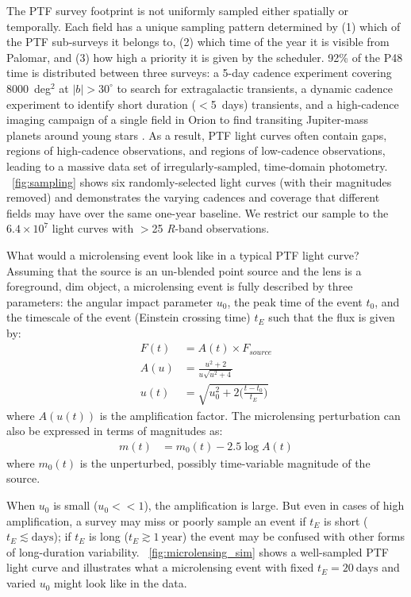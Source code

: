 \documentclass[12pt,preprint]{aastex}
\newcommand{\apwsim}{\raisebox{0.2ex}{\scriptsize$\sim$\normalsize}}
\begin{document}
The PTF survey footprint is not uniformly sampled either spatially or temporally. Each field has a unique sampling pattern determined by (1) which of the PTF sub-surveys it belongs to, (2) which time of the year it is visible from Palomar, and (3) how high a priority it is given by the scheduler. 92\% of the P48 time is distributed between three  surveys: a 5-day cadence experiment covering 8000~deg$^2$ at $|b|>30^\circ$ to search for extragalactic transients, a dynamic cadence experiment to identify short duration ($<$5~days) transients, and a high-cadence imaging campaign of a single field in Orion to find transiting Jupiter-mass planets around young stars \citep{nick2009}. As a result, PTF light curves often contain gaps, regions of high-cadence observations, and regions of low-cadence observations, leading to a massive data set of irregularly-sampled, time-domain photometry. \figurename~\ref{fig:sampling} shows six randomly-selected light curves (with their magnitudes removed) and demonstrates the varying cadences and coverage that different fields may have over the same one-year baseline. We restrict our sample to the \apwsim$6.4\times10^7$ light curves with $>$25 \textit{R}-band observations.

What would a microlensing event look like in a typical PTF light curve? Assuming that the source is an un-blended point source and the lens is a foreground, dim object, a microlensing event is fully described by three parameters: the angular impact parameter $u_0$, the peak time of the event $t_0$, and the timescale of the event (Einstein crossing time) $t_E$ such that the flux is given by:
\begin{align}
	F(t) &= A(t)\times F_{source} \\
	A(u) &= \frac{u^2 + 2}{u\sqrt{u^2 + 4}}\\
	u(t) &= \sqrt{u_0^2 + 2\Big(\frac{t-t_0}{t_E}\Big)}
\end{align}
where $A(u(t))$ is the amplification factor. The microlensing perturbation can also be expressed in terms of magnitudes as:
\begin{align}
	m(t) &= m_0(t) - 2.5\log A(t)
\end{align}
where $m_0(t)$ is the unperturbed, possibly time-variable magnitude of the source.

When $u_0$ is small ($u_0<<1$), the amplification is large. But even in cases of high amplification, a survey may miss or poorly sample an event if $t_E$ is short ($t_E \lesssim\mathrm{days}$); if $t_E$ is long ($t_E \gtrsim 1~\mathrm{year}$) the event may be confused with other forms of long-duration variability. \figurename~\ref{fig:microlensing_sim} shows a well-sampled PTF light curve and illustrates what a microlensing event with fixed $t_E=20~\mathrm{days}$ and varied $u_0$ might look like in the data.
\end{document}
